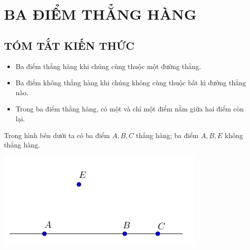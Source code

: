 \section{BA ĐIỂM THẲNG HÀNG}
\subsection{TÓM TẮT KIẾN THỨC}
\begin{tomtat}
\begin{itemize}
\item Ba điểm thẳng hàng khi chúng cùng thuộc một đường thẳng.
\item Ba điểm không thẳng hàng khi chúng không cùng thuộc bất kì đường thẳng nào.
\item Trong ba điểm thẳng hàng, có một và chỉ một điểm nằm giữa hai điểm còn lại.
\end{itemize}
\begin{vd} Trong hình bên dưới ta có ba điểm $A, B, C$ thẳng hàng; ba điểm $A, B, E$ không thẳng hàng. 
\begin{center}
\includegraphics[scale=0.7]{img/bai2_h1}
\end{center}
\end{vd}
\end{tomtat}

